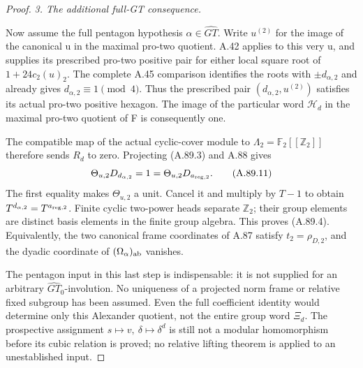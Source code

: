 \begin{proof}
\emph{3. The additional full-GT consequence.}\par
Now assume the full pentagon hypothesis
\(\alpha\in\widehat{GT}\). Write \(u^{(2)}\) for the image of the
canonical u in the maximal pro-two quotient. A.42 applies to this
very u, and supplies its prescribed pro-two positive pair for either
local square root of \(1+24c_2(u)_2\). The complete A.45 comparison
identifies the roots with \(\pm d_{\alpha,2}\) and already
gives \(d_{\alpha,2}\equiv1\pmod4\). Thus the prescribed pair
\((d_{\alpha,2},u^{(2)})\) satisfies its actual pro-two positive hexagon.
The image of the particular word \(\mathcal H_d\) in the
maximal pro-two quotient of F is consequently one.

The compatible map of the actual cyclic-cover module to
\(\Lambda_2=\mathbb F_2[[\mathbb Z_2]]\) therefore sends
\(R_d\) to zero. Projecting (A.89.3) and A.88 gives
\[
       \Theta_{u,2}D_{d_{\alpha,2}}
          =1=\Theta_{u,2}D_{a_{{\rm reg},2}}.
 \tag{A.89.11}
\]
The first equality makes \(\Theta_{u,2}\) a unit. Cancel it
and multiply by \(T-1\) to obtain
\(T^{d_{\alpha,2}}=T^{a_{{\rm reg},2}}\).
Finite cyclic two-power heads separate \(\mathbb Z_2\);
their group elements are distinct basis elements in the finite
group algebra. This proves (A.89.4). Equivalently, the two
canonical frame coordinates of A.87 satisfy
\(t_2=\rho_{D,2}\), and the dyadic coordinate of
\((\Omega_\alpha)_{\rm ab}\) vanishes.

The pentagon input in this last step is indispensable: it is
not supplied for an arbitrary \(\widehat{GT}_0\)-involution.
No uniqueness of a projected norm frame or relative fixed
subgroup has been assumed. Even the full coefficient identity
would determine only this Alexander quotient, not the entire
group word \(\Xi_d\). The prospective assignment
\(s\mapsto v,\ \delta\mapsto\delta^d\) is still not a modular
homomorphism before its cubic relation is proved; no relative
lifting theorem is applied to an unestablished input.
\end{proof}

